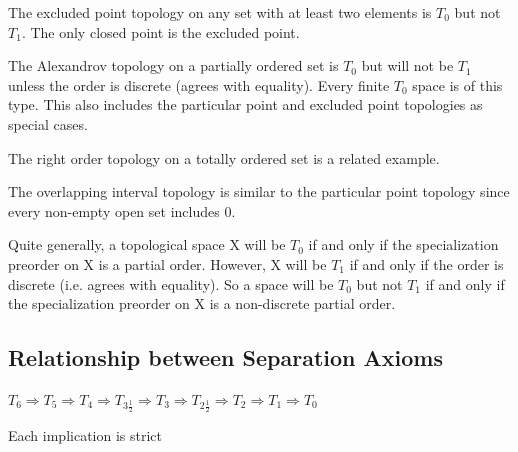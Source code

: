 \documentclass{article}
\begin{document}
The excluded point topology on any set with at least two elements is $T_0$ but not $T_1$. The only closed point is the excluded point.

The Alexandrov topology on a partially ordered set is $T_0$ but will not be $T_1$ unless the order is discrete (agrees with equality). Every finite $T_0$ space is of this type. This also includes the particular point and excluded point topologies as special cases.

The right order topology on a totally ordered set is a related example.

The overlapping interval topology is similar to the particular point topology since every non-empty open set includes 0.

Quite generally, a topological space X will be $T_0$ if and only if the specialization preorder on X is a partial order. However, X will be $T_1$ if and only if the order is discrete (i.e. agrees with equality). So a space will be $T_0$ but not $T_1$ if and only if the specialization preorder on X is a non-discrete partial order.
\subsection{Relationship between Separation Axioms}
$
    T_6
    \Rightarrow T_5
    \Rightarrow T_4
    \Rightarrow T_{3\frac{1}{2}}
    \Rightarrow T_3
    \Rightarrow T_{2\frac{1}{2}}
    \Rightarrow T_2
    \Rightarrow T_1
    \Rightarrow T_0
$

Each implication is strict
\end{document}
